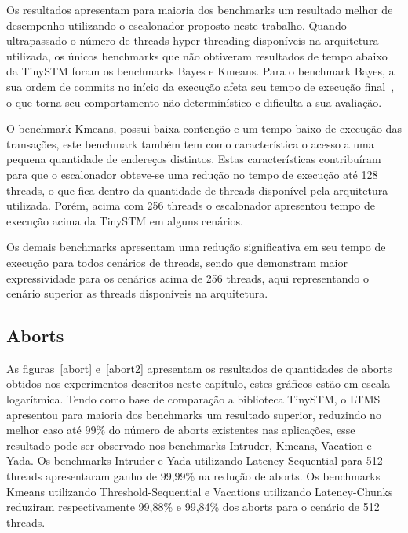 \documentclass[diss,capa]{texufpel}
\begin{document}
Os resultados apresentam para maioria dos benchmarks um resultado melhor de desempenho utilizando o escalonador proposto neste trabalho. Quando ultrapassado o número de threads hyper threading disponíveis na arquitetura utilizada, os únicos benchmarks que não obtiveram resultados de tempo abaixo da TinySTM foram os benchmarks Bayes e Kmeans. Para o benchmark Bayes, a sua ordem de commits no início da execução afeta seu tempo de execução final~\cite{Ruan:2014}, o que torna seu comportamento não determinístico e dificulta a sua avaliação.

O benchmark Kmeans, possui baixa contenção e um tempo baixo de execução das transações, este benchmark também tem como característica o acesso a uma pequena quantidade de endereços distintos. Estas características contribuíram para que o escalonador obteve-se uma redução no tempo de execução até 128 threads, o que fica dentro da quantidade de threads disponível pela arquitetura utilizada. Porém, acima com 256 threads o escalonador apresentou tempo de execução acima da TinySTM em alguns cenários.

Os demais benchmarks apresentam uma redução significativa em seu tempo de execução para todos cenários de threads, sendo que demonstram maior expressividade para os cenários acima de 256 threads, aqui representando o cenário superior as threads disponíveis na arquitetura.




\subsection{Aborts}

As figuras~\ref{abort} e~\ref{abort2} apresentam os resultados de quantidades de aborts obtidos nos experimentos descritos neste capítulo, estes gráficos estão em escala logarítmica. Tendo como base de comparação a biblioteca TinySTM, o LTMS apresentou para maioria dos benchmarks um resultado superior, reduzindo no melhor caso até 99\% do número de aborts existentes nas aplicações, esse resultado pode ser observado nos benchmarks Intruder, Kmeans, Vacation e Yada. Os benchmarks Intruder e Yada utilizando Latency-Sequential para 512 threads apresentaram ganho de 99,99\% na redução de aborts. Os benchmarks Kmeans utilizando Threshold-Sequential e Vacations utilizando Latency-Chunks reduziram respectivamente 99,88\% e 99,84\% dos aborts para o cenário de 512 threads.

\end{document}
